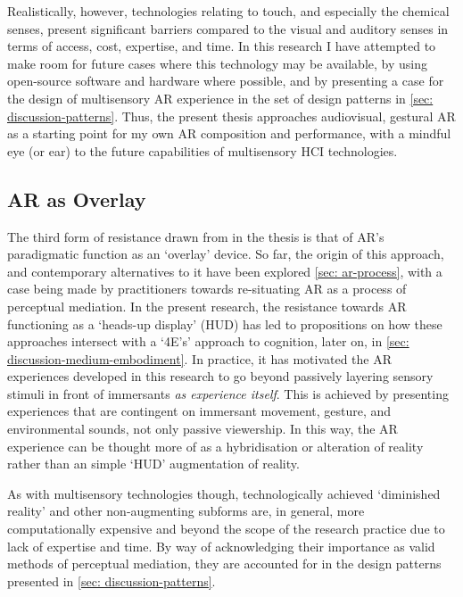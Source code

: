 Realistically, however, technologies relating to touch, and especially the chemical senses, present significant barriers compared to the visual and auditory senses in terms of access, cost, expertise, and time. In this research I have attempted to make room for future cases where this technology may be available, by using open-source software and hardware where possible, and by presenting a case for the design of multisensory AR experience in the set of design patterns in \autoref{sec: discussion-patterns}. Thus, the present thesis approaches audiovisual, gestural AR as a starting point for my own AR composition and performance, with a mindful eye (or ear) to the future capabilities of multisensory HCI technologies.

\subsection{AR as Overlay}\label{sec: method-resistance-overlay}
The third form of resistance drawn from in the thesis is that of AR's paradigmatic function as an `overlay' device. So far, the origin of this approach, and contemporary alternatives to it have been explored \autoref{sec: ar-process}, with a case being made by practitioners \citep{mann1994,schraffenberger2018,chevalier2020} towards re-situating AR as a process of perceptual mediation. In the present research, the resistance towards AR functioning as a `heads-up display' (HUD) has led to propositions on how these approaches intersect with a `4E's' approach to cognition, later on, in \autoref{sec: discussion-medium-embodiment}. In practice, it has motivated the AR experiences developed in this research to go beyond passively layering sensory stimuli in front of immersants \textit{as experience itself}. This is achieved by presenting experiences that are contingent on immersant movement, gesture, and environmental sounds, not only passive viewership. In this way, the AR experience can be thought more of as a hybridisation or alteration of reality rather than an simple `HUD' augmentation of reality.

As with multisensory technologies though, technologically achieved `diminished reality' and other non-augmenting subforms are, in general, more computationally expensive and beyond the scope of the research practice due to lack of expertise and time. By way of acknowledging their importance as valid methods of perceptual mediation, they are accounted for in the design patterns presented in \autoref{sec: discussion-patterns}.



